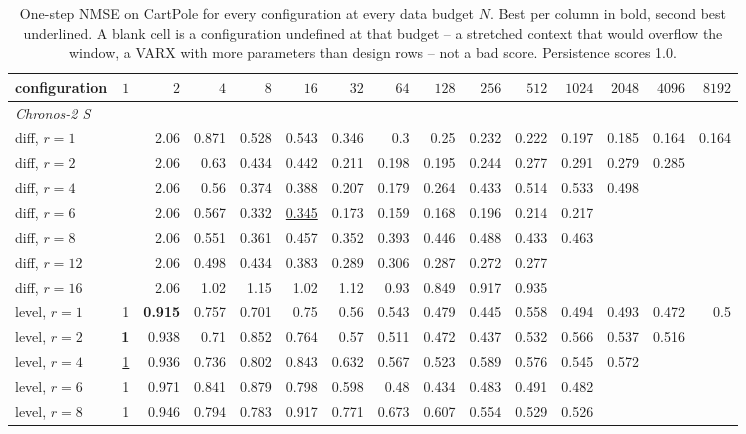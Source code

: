 \begin{table}[t]
\centering\scriptsize
\caption{One-step NMSE on CartPole for every configuration at every data budget $N$. Best per column in bold, second best underlined. A blank cell is a configuration undefined at that budget -- a stretched context that would overflow the window, a VARX with more parameters than design rows -- not a bad score. Persistence scores 1.0.}
\label{tab:grid-cartpole}
\begin{tabular}{lrrrrrrrrrrrrrr}
\toprule
configuration & $1$ & $2$ & $4$ & $8$ & $16$ & $32$ & $64$ & $128$ & $256$ & $512$ & $1024$ & $2048$ & $4096$ & $8192$ \\
\midrule
\multicolumn{15}{l}{\textit{Chronos-2 S}} \\
\quad diff, $r{=}1$ &  & 2.06 & 0.871 & 0.528 & 0.543 & 0.346 & 0.3 & 0.25 & 0.232 & 0.222 & 0.197 & 0.185 & 0.164 & 0.164 \\
\quad diff, $r{=}2$ &  & 2.06 & 0.63 & 0.434 & 0.442 & 0.211 & 0.198 & 0.195 & 0.244 & 0.277 & 0.291 & 0.279 & 0.285 &  \\
\quad diff, $r{=}4$ &  & 2.06 & 0.56 & 0.374 & 0.388 & 0.207 & 0.179 & 0.264 & 0.433 & 0.514 & 0.533 & 0.498 &  &  \\
\quad diff, $r{=}6$ &  & 2.06 & 0.567 & 0.332 & \underline{0.345} & 0.173 & 0.159 & 0.168 & 0.196 & 0.214 & 0.217 &  &  &  \\
\quad diff, $r{=}8$ &  & 2.06 & 0.551 & 0.361 & 0.457 & 0.352 & 0.393 & 0.446 & 0.488 & 0.433 & 0.463 &  &  &  \\
\quad diff, $r{=}12$ &  & 2.06 & 0.498 & 0.434 & 0.383 & 0.289 & 0.306 & 0.287 & 0.272 & 0.277 &  &  &  &  \\
\quad diff, $r{=}16$ &  & 2.06 & 1.02 & 1.15 & 1.02 & 1.12 & 0.93 & 0.849 & 0.917 & 0.935 &  &  &  &  \\
\quad level, $r{=}1$ & 1 & \textbf{0.915} & 0.757 & 0.701 & 0.75 & 0.56 & 0.543 & 0.479 & 0.445 & 0.558 & 0.494 & 0.493 & 0.472 & 0.5 \\
\quad level, $r{=}2$ & \textbf{1} & 0.938 & 0.71 & 0.852 & 0.764 & 0.57 & 0.511 & 0.472 & 0.437 & 0.532 & 0.566 & 0.537 & 0.516 &  \\
\quad level, $r{=}4$ & \underline{1} & 0.936 & 0.736 & 0.802 & 0.843 & 0.632 & 0.567 & 0.523 & 0.589 & 0.576 & 0.545 & 0.572 &  &  \\
\quad level, $r{=}6$ & 1 & 0.971 & 0.841 & 0.879 & 0.798 & 0.598 & 0.48 & 0.434 & 0.483 & 0.491 & 0.482 &  &  &  \\
\quad level, $r{=}8$ & 1 & 0.946 & 0.794 & 0.783 & 0.917 & 0.771 & 0.673 & 0.607 & 0.554 & 0.529 & 0.526 &  &  &  \\

\end{tabular}
\end{table}
